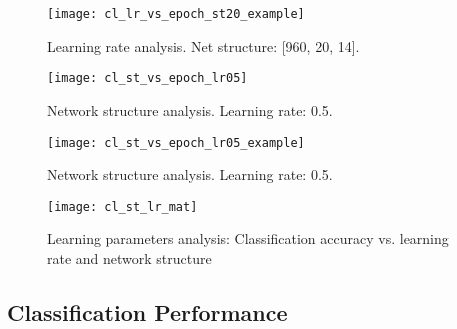 \begin{figure}[H]
  \centering
  \texttt{[image: cl\_lr\_vs\_epoch\_st20\_example]}
  \caption{Learning rate analysis. Net structure: [960, 20, 14].}
  \label{fig:lr_analysis_example}
\end{figure}

\begin{figure}[H]
  \centering
  \texttt{[image: cl\_st\_vs\_epoch\_lr05]}
  \caption{Network structure analysis. Learning rate: 0.5.}
  \label{fig:st_analysis}
\end{figure}

\begin{figure}[H]
  \centering
  \texttt{[image: cl\_st\_vs\_epoch\_lr05\_example]}
  \caption{Network structure analysis. Learning rate: 0.5.}
  \label{fig:st_analysis_example}
\end{figure}

\begin{figure}[H]
  \centering
  \texttt{[image: cl\_st\_lr\_mat]}
  \caption{Learning parameters analysis: Classification accuracy vs. learning rate and network structure}
  \label{fig:acc_st_lr_mat}
\end{figure}

\subsection{Classification Performance} \label{ssec:classification_performance}

